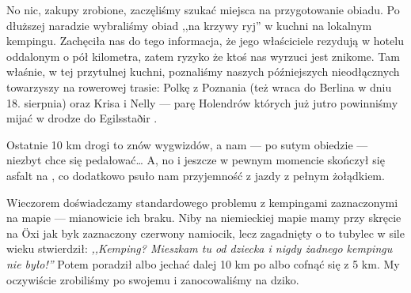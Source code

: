 No nic, zakupy zrobione, zaczęliśmy szukać miejsca na przygotowanie obiadu. Po dłuższej naradzie wybraliśmy obiad ,,na krzywy ryj'' w kuchni na lokalnym kempingu. Zachęciła nas do tego informacja, że jego właściciele rezydują w hotelu oddalonym o pół kilometra, zatem ryzyko że ktoś nas wyrzuci jest znikome. Tam właśnie, w tej przytulnej kuchni, poznaliśmy naszych późniejszych nieodłącznych towarzyszy na rowerowej trasie: Polkę z Poznania (też wraca do Berlina w dniu 18. sierpnia) oraz Krisa i Nelly --- parę Holendrów których już jutro powinniśmy mijać w drodze do Egilsstaðir .

Ostatnie 10 km drogi to znów wygwizdów, a nam --- po sutym obiedzie --- niezbyt chce się pedałować… A, no i jeszcze w pewnym momencie skończył się asfalt na , co dodatkowo psuło nam przyjemność z jazdy z pełnym żołądkiem.


Wieczorem doświadczamy standardowego problemu z kempingami zaznaczonymi na mapie --- mianowicie ich braku. Niby na niemieckiej mapie mamy przy skręcie na Öxi jak byk zaznaczony czerwony namiocik, lecz zagadnięty o to tubylec w sile wieku stwierdził: \emph{,,Kemping? Mieszkam tu od dziecka i nigdy żadnego kempingu nie było!''} Potem poradził albo jechać dalej 10 km po  albo cofnąć się z 5 km. My oczywiście zrobiliśmy po swojemu i zanocowaliśmy na dziko.